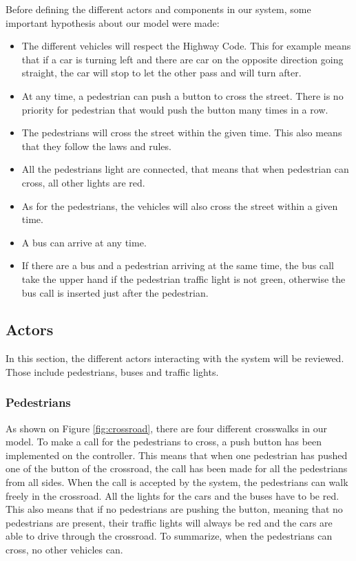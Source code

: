 Before defining the different actors and components in our system, some important hypothesis about our model were made:
\begin{itemize}
    \item The different vehicles will respect the Highway Code. This for example means that if a car is turning left and there are car on the opposite direction going straight, the car will stop to let the other pass and will turn after.
    \item At any time, a pedestrian can push a button to cross the street. There is no priority for pedestrian that would push the button many times in a row.
    \item The pedestrians will cross the street within the given time. This also means that they follow the laws and rules.
    \item All the pedestrians light are connected, that means that when pedestrian can cross, all other lights are red.
    \item As for the pedestrians, the vehicles will also cross the street within a given time.
    \item A bus can arrive at any time.
    \item If there are a bus and a pedestrian arriving at the same time, the bus call take the upper hand if the pedestrian traffic light is not green, otherwise the bus call is inserted just after the pedestrian.
\end{itemize}

\subsection{Actors}
In this section, the different actors interacting with the system will be reviewed. Those include pedestrians, buses and traffic lights.

\subsubsection{Pedestrians}
As shown on Figure \ref{fig:crossroad}, there are four different crosswalks in our model. To make a call for the pedestrians to cross, a push button has been implemented on the controller. This means that when one pedestrian has pushed one of the button of the crossroad, the call has been made for all the pedestrians from all  sides. When the call is accepted by the system, the pedestrians can walk freely in the crossroad. All the lights for the cars and the buses have to be red. This also means that if no pedestrians are pushing the button, meaning that no pedestrians are present, their traffic lights will always be red and the cars are able to drive through the crossroad.
To summarize, when the pedestrians can cross, no other vehicles can. 

